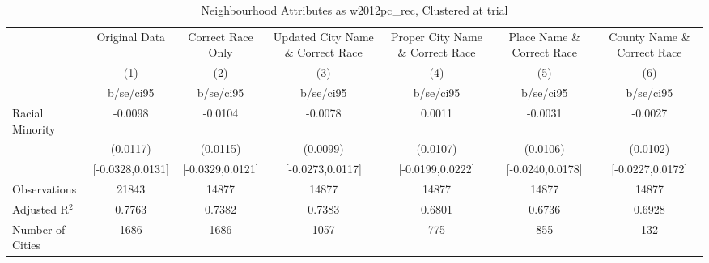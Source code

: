 \documentclass{article}
\begin{document}
\begin{table}[htbp]\centering
\def\sym#1{\ifmmode^{#1}\else\(^{#1}\)\fi}
\caption{Neighbourhood Attributes as w2012pc\_rec, Clustered at trial}
\begin{tabular}{l*{6}{c}}
\toprule
                    &\multicolumn{1}{c}{Original Data}&\multicolumn{1}{c}{Correct Race Only}&\multicolumn{1}{c}{Updated City Name \& Correct Race}&\multicolumn{1}{c}{Proper City Name \& Correct Race}&\multicolumn{1}{c}{Place Name \& Correct Race}&\multicolumn{1}{c}{County Name \& Correct Race}\\\cmidrule(lr){2-2}\cmidrule(lr){3-3}\cmidrule(lr){4-4}\cmidrule(lr){5-5}\cmidrule(lr){6-6}\cmidrule(lr){7-7}
                    &\multicolumn{1}{c}{(1)}   &\multicolumn{1}{c}{(2)}   &\multicolumn{1}{c}{(3)}   &\multicolumn{1}{c}{(4)}   &\multicolumn{1}{c}{(5)}   &\multicolumn{1}{c}{(6)}   \\
                    &   b/se/ci95   &   b/se/ci95   &   b/se/ci95   &   b/se/ci95   &   b/se/ci95   &   b/se/ci95   \\
\midrule
Racial Minority     &     -0.0098   &     -0.0104   &     -0.0078   &      0.0011   &     -0.0031   &     -0.0027   \\
                    &    (0.0117)   &    (0.0115)   &    (0.0099)   &    (0.0107)   &    (0.0106)   &    (0.0102)   \\
                    &[-0.0328,0.0131]   &[-0.0329,0.0121]   &[-0.0273,0.0117]   &[-0.0199,0.0222]   &[-0.0240,0.0178]   &[-0.0227,0.0172]   \\
\midrule
Observations        &       21843   &       14877   &       14877   &       14877   &       14877   &       14877   \\
Adjusted R$^2$      &      0.7763   &      0.7382   &      0.7383   &      0.6801   &      0.6736   &      0.6928   \\
Number of Cities    &        1686   &        1686   &        1057   &         775   &         855   &         132   \\
\bottomrule
\end{tabular}
\end{table}
\end{document}
